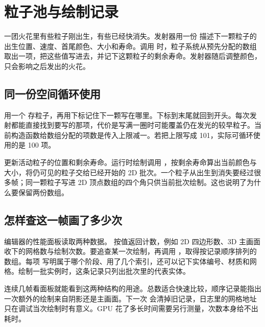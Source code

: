 \clearpage
\section{粒子池与绘制记录}\label{sec:data-observe}
一团火花里有些粒子刚出生，有些已经快消失。发射器用一份  描述下一颗粒子的出生位置、速度、首尾颜色、大小和寿命。调用  时，粒子系统从预先分配的数组取出一项，把这些值写进去，并记下这颗粒子的剩余寿命。发射器随后调整颜色，只会影响之后发出的火花。

\subsection{同一份空间循环使用}
 用一个  存粒子，再用下标记住下一颗写在哪里。下标到末尾就回到开头。每次发射都能直接找到要写的那项，代价是写满一圈时可能覆盖仍在发光的较早粒子。当前构造函数给数组分配的项数是传入上限减一。若把上限写成 101，实际可循环使用的是 100 项。

 更新活动粒子的位置和剩余寿命。运行时绘制调用 ，按剩余寿命算出当前颜色与大小，将仍可见的粒子交给已经开始的 2D 批次。一个粒子从出生到消失要经过很多帧；同一颗粒子写进 2D 顶点数组的四个角只供当前批次绘制。这也说明了为什么要保留两份数组。

\subsection{怎样查这一帧画了多少次}
编辑器的性能面板读取两种数据。 按值返回计数，例如 2D 四边形数、3D 主画面收下的网格数与绘制次数。要追查某一次绘制，再调用 ，取得按记录顺序排列的数组。每项  写明属于哪个阶段、用了几个索引，还可以记下实体编号、材质和网格。绘制一批实例时，这条记录只列出批次里的代表实体。

连续几帧看面板就能看到这两种结构的用途。总数适合快速比较，顺序记录能指出一次额外的绘制来自阴影还是主画面。下一次  会清掉旧记录，日志里的网格地址只在调试当次绘制时有意义。GPU 花了多长时间需要另行测量，次数本身给不出耗时。


